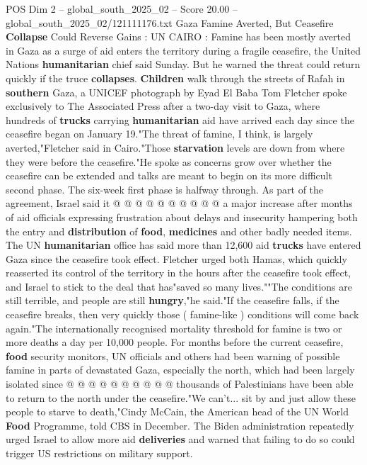 \begin{textsample}{POS Dim 2 – global\_south\_2025\_02 – Score 20.00 – global\_south\_2025\_02/121111176.txt}  \label{ex:f2_pos_425}
Gaza Famine Averted, But Ceasefire \textbf{Collapse} Could Reverse Gains : UN CAIRO : Famine has been mostly averted in Gaza as a surge of aid enters the territory during a fragile ceasefire, the United Nations \textbf{humanitarian} chief said Sunday.
But he warned the threat could return quickly if the truce \textbf{collapses}. \textbf{Children} walk through the streets of Rafah in \textbf{southern} Gaza, a UNICEF photograph by Eyad El Baba Tom Fletcher spoke exclusively to The Associated Press after a two-day visit to Gaza, where hundreds of \textbf{trucks} carrying \textbf{humanitarian} aid have arrived each day since the ceasefire began on January 19."The threat of famine, I think, is largely averted,"Fletcher said in Cairo."Those \textbf{starvation} levels are down from where they were before the ceasefire."He spoke as concerns grow over whether the ceasefire can be extended and talks are meant to begin on its more difficult second phase.
The six-week first phase is halfway through.
As part of the agreement, Israel said it @ @ @ @ @ @ @ @ @ @ a major increase after months of aid officials expressing frustration about delays and insecurity hampering both the entry and \textbf{distribution} of \textbf{food}, \textbf{medicines} and other badly needed items.
The UN \textbf{humanitarian} office has said more than 12,600 aid \textbf{trucks} have entered Gaza since the ceasefire took effect.
Fletcher urged both Hamas, which quickly reasserted its control of the territory in the hours after the ceasefire took effect, and Israel to stick to the deal that has"saved so many lives.""The conditions are still terrible, and people are still \textbf{hungry},"he said."If the ceasefire falls, if the ceasefire breaks, then very quickly those ( famine-like ) conditions will come back again."The internationally recognised mortality threshold for famine is two or more deaths a day per 10,000 people.
For months before the current ceasefire, \textbf{food} security monitors, UN officials and others had been warning of possible famine in parts of devastated Gaza, especially the north, which had been largely isolated since @ @ @ @ @ @ @ @ @ @ thousands of Palestinians have been able to return to the north under the ceasefire."We can't... sit by and just allow these people to starve to death,"Cindy McCain, the American head of the UN World \textbf{Food} Programme, told CBS in December.
The Biden administration repeatedly urged Israel to allow more aid \textbf{deliveries} and warned that failing to do so could trigger US restrictions on military support.

\end{textsample}
